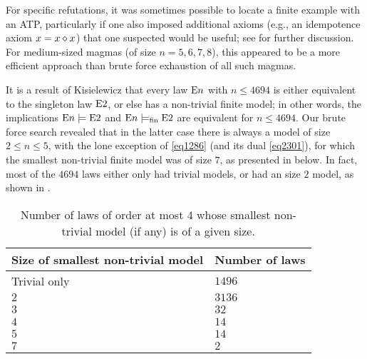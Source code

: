 For specific refutations, it was sometimes possible to locate a finite example with an ATP, particularly if one also imposed additional axioms (e.g., an idempotence axiom $x = x \diamond x$) that one suspected would be useful; see  for further discussion.  For medium-sized magmas (of size $n=5,6,7,8$), this appeared to be a more efficient approach than brute force exhaustion of all such magmas.

It is a result of Kisielewicz \cite{Kisielewicz} that every law $\mathrm{E}n$ with $n \leq 4694$ is either equivalent to the singleton law $\mathrm{E}2$, or else has a non-trivial finite model; in other words, the implications $\mathrm{E}n \models \mathrm{E}2$ and $\mathrm{E}n \models_{\mathrm{fin}} \mathrm{E}2$ are equivalent for $n \leq 4694$.  Our brute force search revealed that in the latter case there is always a model of size $2 \leq n \leq 5$, with the lone exception of \eqref{eq1286} (and its dual \eqref{eq2301}), for which the smallest non-trivial finite model was of size $7$, as presented in  below.  In fact, most of the $\num{4694}$ laws either only had trivial models, or had an size $2$ model, as shown in .
\begin{table}
\centering
\begin{tabular}{ll}
  \hline
Size of smallest non-trivial model & Number of laws \\
\hline
Trivial only & $1496$ \\
$2$ & $3136$ \\
$3$ & $32$ \\
$4$ & $14$ \\
$5$ & $14$ \\
$7$ & $2$\\
\hline
\end{tabular}
\caption{Number of laws of order at most $4$ whose smallest non-trivial model (if any) is of a given size.}\label{size-table}
\end{table}

